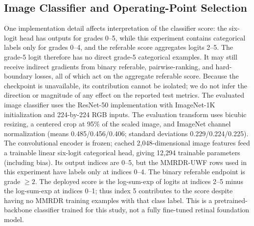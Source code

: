 \documentclass{ieeeaccess}
\begin{document}
\subsection{Image Classifier and Operating-Point Selection}
One implementation detail affects interpretation of the classifier score: the six-logit head has outputs for grades 0--5, while this experiment contains categorical labels only for grades 0--4, and the referable score aggregates logits 2--5. The grade-5 logit therefore has no direct grade-5 categorical examples. It may still receive indirect gradients from binary referable, pairwise-ranking, and hard-boundary losses, all of which act on the aggregate referable score. Because the checkpoint is unavailable, its contribution cannot be isolated; we do not infer the direction or magnitude of any effect on the reported test metrics.
The evaluated image classifier uses the  ResNet-50 implementation with ImageNet-1K initialization and 224-by-224 RGB inputs. The evaluation transform uses bicubic resizing, a centered crop at 95\% of the scaled image, and ImageNet channel normalization (means 0.485/0.456/0.406; standard deviations 0.229/0.224/0.225). The convolutional encoder is frozen; cached 2,048-dimensional image features feed a trainable linear six-logit categorical head, giving 12,294 trainable parameters (including bias). Its output indices are 0--5, but the MMRDR-UWF rows used in this experiment have labels only at indices 0--4. The binary referable endpoint is grade $\geq2$. The deployed score is the log-sum-exp of logits at indices 2--5 minus the log-sum-exp at indices 0--1; thus index 5 contributes to the score despite having no MMRDR training examples with that class label. This is a pretrained-backbone classifier trained for this study, not a fully fine-tuned retinal foundation model.
\end{document}
